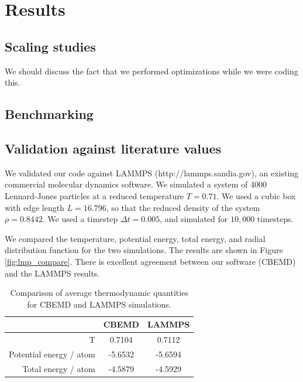\section{Results}

\subsection{Scaling studies}
We should discuss the fact that we performed optimizations while we were coding this.
\subsection{Benchmarking}

\subsection{Validation against literature values}

We validated our code against LAMMPS \cite{plimpton1995fast} (http://lammps.sandia.gov), an existing commercial molecular dynamics software.
%
We simulated a system of 4000 Lennard-Jones particles at a reduced temperature $T=0.71$. 
%
We used a cubic box with edge length $L=16.796$, so that the reduced density of the system $\rho = 0.8442$. 
%
We used a timestep $\Delta t=0.005$, and simulated for $10,000$ timesteps.


We compared the temperature, potential energy, total energy, and radial distribution function for the two simulations. 
%
The results are shown in Figure \ref{fig:lmp_compare}. 
% 
There is excellent agreement between our software (CBEMD) and the LAMMPS results. 

\begin{table}
	\begin{tabular}{| r | c | c |}
		\hline
		 & CBEMD & LAMMPS \\
		 \hline
		 T & 0.7104 & 0.7112 \\
		 \hline
		 Potential energy / atom & -5.6532 & -5.6594 \\
		 \hline
		 Total energy / atom & -4.5879 & -4.5929 \\
		 \hline
	\end{tabular}
	\caption{Comparison of average thermodynamic quantities for CBEMD and LAMMPS simulations.}
	\label{table:lmp_compare}
\end{table}
		 
